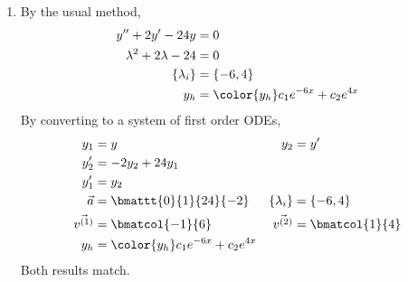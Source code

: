 \begin{enumerate}
    \item By the usual method,
          \begin{align}
              y'' + 2y' - 24y             & = 0                                    \\
              \lambda^{2} + 2\lambda - 24 & = 0                                    \\
              \{\lambda_i\}               & = \{-6, 4\}                            \\
              y_h                         & = \color{y_h} c_1 e^{-6x} + c_2 e^{4x}
          \end{align}
          By converting to a system of first order ODEs,
          \begin{align}
              y_1           & = y                                    & y_2           & = y'             \\
              y_2'          & = -2y_2 + 24y_1                                                           \\
              y_1'          & = y_2                                                                     \\
              \vec{a}       & = \bmattt{0}{1}{24}{-2}                & \{\lambda_i\} & = \{-6, 4\}      \\
              \vec{v^{(1)}} & = \bmatcol{-1}{6}                      & \vec{v^{(2)}} & = \bmatcol{1}{4} \\
              y_h           & = \color{y_h} c_1 e^{-6x} + c_2 e^{4x}
          \end{align}
          Both results match.


\end{enumerate}
